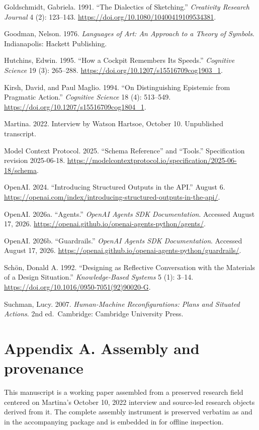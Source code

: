 \documentclass[
  11pt,
  letterpaper,
]{article}
\begin{document}
Goldschmidt, Gabriela. 1991. ``The Dialectics of Sketching.''
\emph{Creativity Research Journal} 4 (2): 123--143.
\url{https://doi.org/10.1080/10400419109534381}.

Goodman, Nelson. 1976. \emph{Languages of Art: An Approach to a Theory
of Symbols}. Indianapolis: Hackett Publishing.

Hutchins, Edwin. 1995. ``How a Cockpit Remembers Its Speeds.''
\emph{Cognitive Science} 19 (3): 265--288.
\url{https://doi.org/10.1207/s15516709cog1903_1}.

Kirsh, David, and Paul Maglio. 1994. ``On Distinguishing Epistemic from
Pragmatic Action.'' \emph{Cognitive Science} 18 (4): 513--549.
\url{https://doi.org/10.1207/s15516709cog1804_1}.

Martina. 2022. Interview by Watson Hartsoe, October 10. Unpublished
transcript.

Model Context Protocol. 2025. ``Schema Reference'' and ``Tools.''
Specification revision 2025-06-18.
\url{https://modelcontextprotocol.io/specification/2025-06-18/schema}.

OpenAI. 2024. ``Introducing Structured Outputs in the API.'' August 6.
\url{https://openai.com/index/introducing-structured-outputs-in-the-api/}.

OpenAI. 2026a. ``Agents.'' \emph{OpenAI Agents SDK Documentation}.
Accessed August 17, 2026.
\url{https://openai.github.io/openai-agents-python/agents/}.

OpenAI. 2026b. ``Guardrails.'' \emph{OpenAI Agents SDK Documentation}.
Accessed August 17, 2026.
\url{https://openai.github.io/openai-agents-python/guardrails/}.

Schön, Donald A. 1992. ``Designing as Reflective Conversation with the
Materials of a Design Situation.'' \emph{Knowledge-Based Systems} 5 (1):
3--14. \url{https://doi.org/10.1016/0950-7051(92)90020-G}.

Suchman, Lucy. 2007. \emph{Human-Machine Reconfigurations: Plans and
Situated Actions}. 2nd ed.~Cambridge: Cambridge University Press.

\newpage

\section{Appendix A. Assembly and
provenance}\label{appendix-a.-assembly-and-provenance}

This manuscript is a working paper assembled from a preserved research
field centered on Martina's October 10, 2022 interview and source-led
research objects derived from it. The complete assembly instrument is
preserved verbatim as  and
 in the accompanying
package and is embedded in  for offline inspection.
\end{document}
